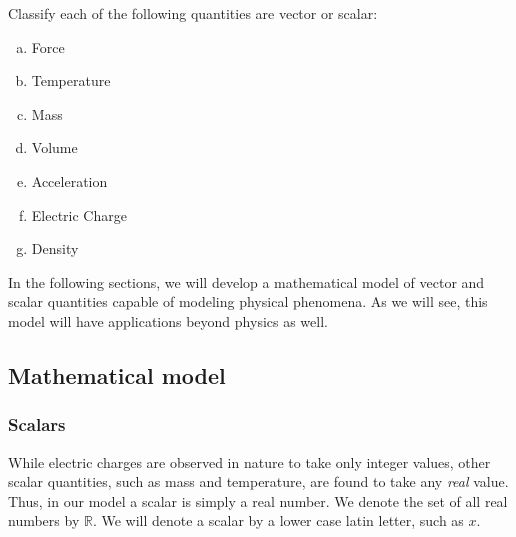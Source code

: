 \documentclass[12pt,letterpaper,reqno]{article}
\numberwithin{equation}{section}
\begin{document}
\begin{exercise}
Classify each of the following quantities are vector or scalar:
\begin{enumerate}[(a)]
	\item Force
	\item Temperature
	\item Mass
	\item Volume
	\item Acceleration
	\item Electric Charge
	\item Density
\end{enumerate}	
\end{exercise}

In the following sections, we will develop a mathematical model of vector and scalar quantities capable of modeling physical phenomena. As we will see, this model will have applications beyond physics as well.

\subsection{Mathematical model}
\subsubsection{Scalars}\label{sec:scalars}
While electric charges are observed in nature to take only integer values, other scalar quantities, such as mass and temperature, are found to take any \emph{real} value. Thus, in our model a scalar is simply a real number. We denote the set of all real numbers by $\mathbb{R}$. We will denote a scalar by a lower case latin letter, such as $x$.
\end{document}
